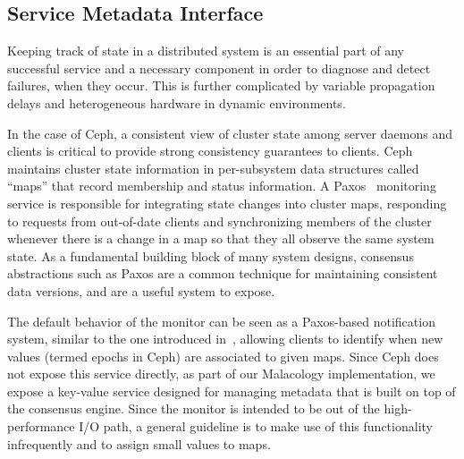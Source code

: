 \subsection{Service Metadata Interface}
\label{sec:mon}
\label{sec:service-metadata-interface}
\label{service-metadata}

Keeping track of state in a distributed system is an essential part of any
successful service and a necessary component in order to diagnose and detect
failures, when they occur. This is further complicated by variable propagation
delays and heterogeneous hardware in dynamic environments.

 In the
case of Ceph, a consistent view of cluster state among server daemons and
clients is critical to provide strong consistency guarantees to clients.  Ceph
maintains cluster state information in per-subsystem  data structures called
``maps'' that record membership and status information.  A
Paxos~\cite{lamport_parttime_1998} monitoring service is responsible for
integrating state changes into cluster maps, responding to requests from
out-of-date clients and synchronizing members of the cluster whenever there is
a change in a map so that they all observe the same system state. As a
fundamental building block of many system designs, consensus abstractions such
as Paxos are a common technique for maintaining consistent data versions, and
are a useful system to expose.

The default behavior of the monitor can be seen as a Paxos-based notification
system, similar to the one introduced in~\cite{burrows_chubby_2006}, allowing
clients to identify when new values (termed epochs in Ceph) are associated to
given maps.  Since Ceph does not expose this service directly, as part of our
Malacology implementation, we expose a key-value service designed for managing
  metadata that is built on
top of the consensus engine. Since the monitor is intended to be out of the
high-performance I/O path, a general guideline is to make use of this
functionality infrequently and to assign small values to maps.\\

